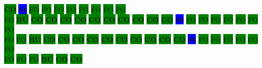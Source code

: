 \colorbox{green}{\color[rgb]{0,0,0}\textbf{CO}}%
\colorbox{blue}{\color[rgb]{1,0,0}\textbf{04}}%
\colorbox{green}{\color[gray]{0.75}FO}%
\colorbox{green}{\color[gray]{0.75}FO}%
\colorbox{green}{\color[gray]{0.75}FO}%
\colorbox{green}{\color[gray]{0.75}FO}%
\colorbox{green}{\color[gray]{0.75}FO}%
\colorbox{green}{\color[gray]{0.75}FO}%
\colorbox{green}{\color[gray]{0.75}FO}%
\colorbox{green}{\color[gray]{0.75}FO}%
\\
\colorbox{green}{\color[gray]{0.75}FO}%
\colorbox{green}{\color[rgb]{1,0,0}\textbf{BU}}%
\colorbox{green}{\color[rgb]{0,0,0}\textbf{CO}}%
\colorbox{green}{\color[rgb]{0,0,0}\textbf{CO}}%
\colorbox{green}{\color[rgb]{0,0,0}\textbf{CO}}%
\colorbox{green}{\color[rgb]{0,0,0}\textbf{CO}}%
\colorbox{green}{\color[rgb]{0,0,0}\textbf{CO}}%
\colorbox{green}{\color[rgb]{0,0,0}\textbf{CO}}%
\colorbox{green}{\color[rgb]{0,0,0}\textbf{CO}}%
\colorbox{green}{\color[rgb]{0,0,0}\textbf{CO}}%
\colorbox{green}{\color[rgb]{0,0,0}\textbf{CO}}%
\colorbox{green}{\color[rgb]{0,0,0}\textbf{CO}}%
\colorbox{blue}{\color[rgb]{1,0,0}\textbf{06}}%
\colorbox{green}{\color[gray]{0.75}FO}%
\colorbox{green}{\color[gray]{0.75}FO}%
\colorbox{green}{\color[gray]{0.75}FO}%
\colorbox{green}{\color[gray]{0.75}FO}%
\colorbox{green}{\color[gray]{0.75}FO}%
\colorbox{green}{\color[gray]{0.75}FO}%
\colorbox{green}{\color[gray]{0.75}FO}%
\\
\colorbox{green}{\color[gray]{0.75}FO}%
\colorbox{green}{\color[gray]{0.75}FO}%
\colorbox{green}{\color[rgb]{1,0,0}\textbf{BU}}%
\colorbox{green}{\color[rgb]{0,0,0}\textbf{CO}}%
\colorbox{green}{\color[rgb]{0,0,0}\textbf{CO}}%
\colorbox{green}{\color[rgb]{0,0,0}\textbf{CO}}%
\colorbox{green}{\color[rgb]{0,0,0}\textbf{CO}}%
\colorbox{green}{\color[rgb]{0,0,0}\textbf{CO}}%
\colorbox{green}{\color[rgb]{0,0,0}\textbf{CO}}%
\colorbox{green}{\color[rgb]{0,0,0}\textbf{CO}}%
\colorbox{green}{\color[rgb]{0,0,0}\textbf{CO}}%
\colorbox{green}{\color[rgb]{0,0,0}\textbf{CO}}%
\colorbox{green}{\color[rgb]{0,0,0}\textbf{CO}}%
\colorbox{blue}{\color[rgb]{1,0,0}\textbf{08}}%
\colorbox{green}{\color[gray]{0.75}FO}%
\colorbox{green}{\color[gray]{0.75}FO}%
\colorbox{green}{\color[gray]{0.75}FO}%
\colorbox{green}{\color[gray]{0.75}FO}%
\colorbox{green}{\color[gray]{0.75}FO}%
\colorbox{green}{\color[gray]{0.75}FO}%
\\
\colorbox{green}{\color[gray]{0.75}FO}%
\colorbox{green}{\color[gray]{0.75}FO}%
\colorbox{green}{\color[gray]{0.75}FO}%
\colorbox{green}{\color[rgb]{1,0,0}\textbf{BU}}%
\colorbox{green}{\color[rgb]{0,0,0}\textbf{CO}}%
\colorbox{green}{\color[rgb]{0,0,0}\textbf{CO}}%
